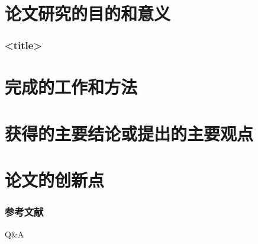 \documentclass[a4paper,12pt]{ctexbeamer}
\begin{document}
\section{论文研究的目的和意义}
\begin{frame}
    \frametitle{<title>}


\end{frame}

\section{完成的工作和方法}
\section{获得的主要结论或提出的主要观点}
\section{论文的创新点}
\appendix
\nocite{*}
\begin{frame}[allowframebreaks]
    \frametitle{参考文献}
    \printbibliography
\end{frame}
\begin{frame}
    \centering
    \Huge Q\&A
\end{frame}
\end{document}
